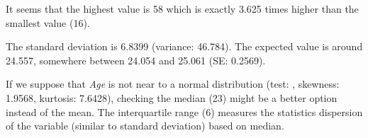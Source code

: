 \documentclass{article}
\begin{document}
It seems that the highest value is 58 which is exactly 3.625 times
higher than the smallest value (16).

The standard deviation is 6.8399 (variance: 46.784). The expected value
is around 24.557, somewhere between 24.054 and 25.061 (SE: 0.2569).

If we suppose that \emph{Age} is not near to a normal distribution
(test: , skewness: 1.9568, kurtosis: 7.6428), checking the median (23)
might be a better option instead of the mean. The interquartile range
(6) measures the statistics dispersion of the variable (similar to
standard deviation) based on median.
\end{document}
